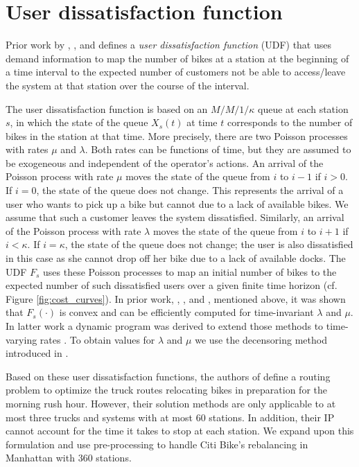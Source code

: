 \section{User dissatisfaction function}\label{sec:udf}
Prior work by \cite{o2015smarter}, \cite{raviv2013optimal}, and \cite{schuijbroek2013inventory} defines a \emph{user dissatisfaction function} (UDF) that uses demand information to map the number of bikes at a station at the beginning of a time interval to the expected number of customers not be able to access/leave the system at that station over the course of the interval. %

The user dissatisfaction function is based on an $M/M/1/\kappa$ queue at each station $s$, in which the state of the queue $X_s(t)$ at time $t$ corresponds to the number of bikes in the station at that time. More precisely, there are two Poisson processes with rates $\mu$ and $\lambda$. Both rates can be functions of time, but they are assumed to be exogeneous and independent of the operator's actions. An arrival of the Poisson process with rate $\mu$ moves the state of the queue from $i$ to $i-1$ if $i>0$. If $i =0$, the state of the queue does not change. This represents the arrival of a user who wants to pick up a bike but cannot due to a lack of available bikes. We assume that such a customer leaves the system dissatisfied. Similarly, an arrival of the Poisson process with rate $\lambda$ moves the state of the queue from $i$ to $i+1$ if $i<\kappa$. If $i =\kappa$, the state of the queue does not change; the user is also dissatisfied in this case as she cannot drop off her bike due to a lack of available docks. The UDF $F_s$ uses these Poisson processes to map an initial number of bikes to the expected number of such dissatisfied users over a given finite time horizon (cf. Figure \ref{fig:cost_curves}). In prior work, \cite{o2015smarter}, \cite{raviv2013optimal}, and \cite{schuijbroek2013inventory}, mentioned above, it was shown that $F_s(\cdot)$ is convex and can be efficiently computed for time-invariant $\lambda$ and $\mu$. In latter work a dynamic program was derived to extend those methods to time-varying rates \cite{parikh2014estimation}. To obtain values for $\lambda$ and $\mu$ we use the decensoring method introduced in \cite{o2015data}. %

Based on these user dissatisfaction functions, the authors of \cite{raviv2013static} define a routing problem to optimize the truck routes relocating bikes in preparation for the morning rush hour. However, their solution methods are only applicable to at most three trucks and systems with at most 60 stations. In addition, their IP cannot account for the time it takes to stop at each station. We expand upon this formulation and use pre-processing to handle Citi Bike's rebalancing in Manhattan with 360 stations. %

